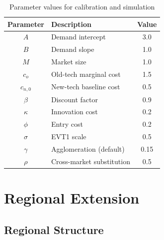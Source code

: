 \documentclass[12pt]{article}
\begin{document}
\begin{table}[ht]
  \centering
  \caption{Parameter values for calibration and simulation}
  \medskip
  \label{tab:params}
  \begin{tabular}{clc}
    \toprule
    Parameter & Description & Value \\
    \midrule
    $A$       & Demand intercept              & 3.0  \\
    $B$       & Demand slope                  & 1.0  \\
    $M$       & Market size                   & 1.0  \\
    $c_o$     & Old-tech marginal cost        & 1.5  \\
    $c_{n,0}$ & New-tech baseline cost        & 0.5  \\
    $\beta$   & Discount factor               & 0.9  \\
    $\kappa$  & Innovation cost               & 0.2  \\
    $\phi$    & Entry cost                    & 0.2  \\
    $\sigma$  & EVT1 scale                    & 0.5  \\
    $\gamma$  & Agglomeration (default)       & 0.15 \\
    $\rho$    & Cross-market substitution     & 0.5  \\
    \bottomrule
  \end{tabular}
\end{table}

\section{Regional Extension}

\subsection{Regional Structure}
\end{document}
